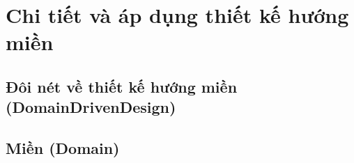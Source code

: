 \documentclass[oneside]{report} %
\begin{document}










\chapter{Chi tiết và áp dụng thiết kế hướng miền}

\section{Đôi nét về thiết kế hướng miền (DomainDrivenDesign)}

% 

% 

\section{Miền (Domain)}
\end{document}

